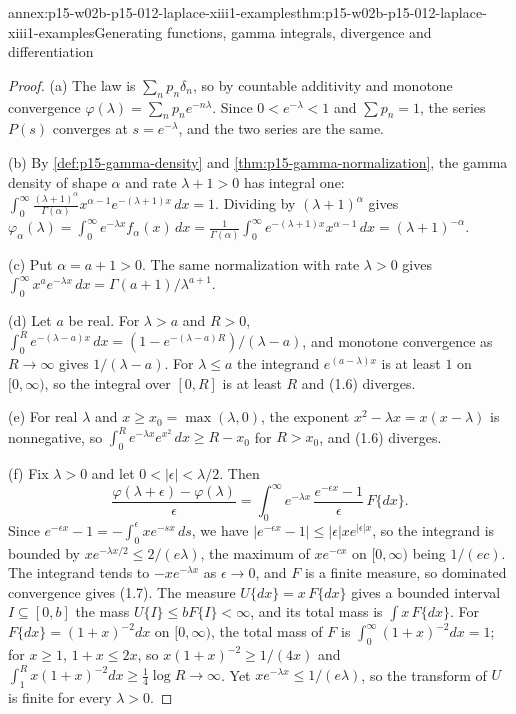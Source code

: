 \begin{annexitem}{annex:p15-w02b-p15-012-laplace-xiii1-examples}{thm:p15-w02b-p15-012-laplace-xiii1-examples}{Generating functions, gamma integrals, divergence and differentiation}
\begin{proof}
(a) The law is \(\sum_np_n\delta_n\), so by countable additivity and monotone
convergence \(\varphi(\lambda)=\sum_np_ne^{-n\lambda}\). Since
\(0<e^{-\lambda}<1\) and \(\sum p_n=1\), the series \(P(s)\) converges at
\(s=e^{-\lambda}\), and the two series are the same.

(b) By \cref{def:p15-gamma-density} and \cref{thm:p15-gamma-normalization},
the gamma density of shape \(\alpha\) and rate \(\lambda+1>0\) has integral
one:
\(\int_0^\infty\frac{(\lambda+1)^\alpha}{\Gamma(\alpha)}x^{\alpha-1}e^{-(\lambda+1)x}\,dx=1\).
Dividing by \((\lambda+1)^\alpha\) gives
\(\varphi_\alpha(\lambda)=\int_0^\infty e^{-\lambda x}f_\alpha(x)\,dx
=\frac1{\Gamma(\alpha)}\int_0^\infty e^{-(\lambda+1)x}x^{\alpha-1}\,dx=(\lambda+1)^{-\alpha}\).

(c) Put \(\alpha=a+1>0\). The same normalization with rate \(\lambda>0\) gives
\(\int_0^\infty x^{a}e^{-\lambda x}\,dx=\Gamma(a+1)/\lambda^{a+1}\).

(d) Let \(a\) be real. For \(\lambda>a\) and \(R>0\),
\(\int_0^Re^{-(\lambda-a)x}\,dx=(1-e^{-(\lambda-a)R})/(\lambda-a)\), and
monotone convergence as \(R\to\infty\) gives \(1/(\lambda-a)\). For
\(\lambda\leq a\) the integrand \(e^{(a-\lambda)x}\) is at least \(1\) on
\([0,\infty)\), so the integral over \([0,R]\) is at least \(R\) and (1.6)
diverges.

(e) For real \(\lambda\) and \(x\geq x_0=\max(\lambda,0)\), the exponent
\(x^2-\lambda x=x(x-\lambda)\) is nonnegative, so
\(\int_0^Re^{-\lambda x}e^{x^2}\,dx\geq R-x_0\) for \(R>x_0\), and (1.6)
diverges.

(f) Fix \(\lambda>0\) and let \(0<|\epsilon|<\lambda/2\). Then
\[
 \frac{\varphi(\lambda+\epsilon)-\varphi(\lambda)}\epsilon
  =\int_0^\infty e^{-\lambda x}\,\frac{e^{-\epsilon x}-1}\epsilon\,F\{dx\}.
\]
Since \(e^{-\epsilon x}-1=-\int_0^\epsilon xe^{-sx}\,ds\), we have
\(|e^{-\epsilon x}-1|\leq|\epsilon|xe^{|\epsilon|x}\), so the integrand is
bounded by \(xe^{-\lambda x/2}\leq2/(e\lambda)\), the maximum of
\(xe^{-cx}\) on \([0,\infty)\) being \(1/(ec)\). The integrand tends to
\(-xe^{-\lambda x}\) as \(\epsilon\to0\), and \(F\) is a finite measure, so
dominated convergence gives (1.7). The measure \(U\{dx\}=x\,F\{dx\}\) gives a
bounded interval \(I\subseteq[0,b]\) the mass \(U\{I\}\leq bF\{I\}<\infty\), and its
total mass is \(\int x\,F\{dx\}\). For \(F\{dx\}=(1+x)^{-2}dx\) on
\([0,\infty)\), the total mass of \(F\) is \(\int_0^\infty(1+x)^{-2}dx=1\); for
\(x\geq1\), \(1+x\leq2x\), so \(x(1+x)^{-2}\geq1/(4x)\) and
\(\int_1^Rx(1+x)^{-2}dx\geq\frac14\log R\to\infty\). Yet
\(xe^{-\lambda x}\leq1/(e\lambda)\), so the transform of \(U\) is finite for
every \(\lambda>0\).
\end{proof}
\end{annexitem}

